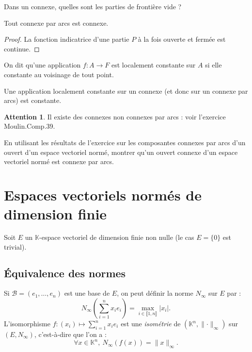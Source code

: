 \documentclass[french]{article}
\newcommand{\K}{\mathbb{K}}
\theoremstyle{plain}
\theoremstyle{definition}
\newtheorem*{attention}{Attention}
\theoremstyle{remark}
\begin{document}
\begin{exo}
	Dans un connexe, quelles sont les parties de frontière vide ?
\end{exo}

\begin{prop}%
	Tout connexe par arcs est connexe.
\end{prop}
\begin{proof}
	La fonction indicatrice d'une partie $P$ à la fois ouverte et fermée est continue.
\end{proof}

\begin{dfn}
	On dit qu'une application $f:A\to F$ est localement constante sur $A$ si elle constante au voisinage de tout point.
\end{dfn}

\begin{cor}%
	Une application localement constante sur un connexe (et donc sur un connexe par arcs) est constante.
\end{cor}

\begin{attention}
	Il existe des connexes non connexes par arcs : voir l'exercice Moulin.Comp.39.
\end{attention}

\begin{exo}
	En utilisant les résultats de l'exercice sur les composantes connexes par arcs d'un ouvert d'un espace vectoriel normé, montrer qu'un ouvert connexe d'un espace vectoriel normé est connexe par arcs.
\end{exo}

\section{Espaces vectoriels normés de dimension finie}

Soit $E$ un $\K$-espace vectoriel de dimension finie non nulle (le cas $E=\{0\}$ est trivial).

\subsection{Équivalence des normes}

Si $\mathcal{B}=(e_1,\ldots,e_n)$ est une base de $E$, on peut définir la norme $N_\infty$ sur $E$ par : $$N_\infty\left(\displaystyle\sum_{i=1}^{n}x_ie_i\right)=\underset{i\in\llbracket1,n\rrbracket}{\max}\lvert x_i\rvert.$$
L'isomorphisme $f:(x_i)\mapsto\displaystyle\sum_{i=1}^{n}x_ie_i$ est une \textit{isométrie} de $(\K^n,\lVert\cdot\rVert_\infty)$ sur $(E,N_\infty)$, c'est-à-dire que l'on a : 
$$\forall x\in\K^n,\ N_\infty(f(x))=\lVert x\rVert_\infty.$$
\end{document}
